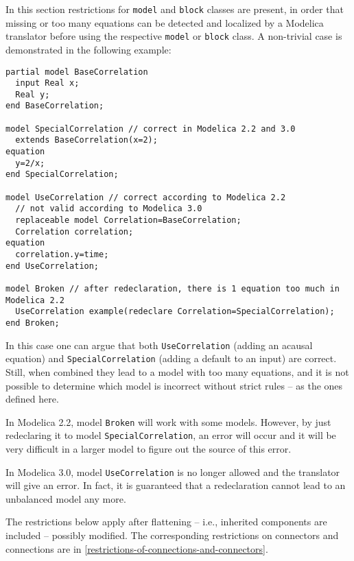 \begin{nonnormative}
In this section restrictions for \lstinline!model! and \lstinline!block! classes are present, in order that missing or too many equations can be detected and localized by a Modelica translator before using the respective \lstinline!model! or \lstinline!block! class.
A non-trivial case is demonstrated in the following example:
\begin{lstlisting}[language=modelica]
partial model BaseCorrelation
  input Real x;
  Real y;
end BaseCorrelation;

model SpecialCorrelation // correct in Modelica 2.2 and 3.0
  extends BaseCorrelation(x=2);
equation
  y=2/x;
end SpecialCorrelation;

model UseCorrelation // correct according to Modelica 2.2
  // not valid according to Modelica 3.0
  replaceable model Correlation=BaseCorrelation;
  Correlation correlation;
equation
  correlation.y=time;
end UseCorrelation;

model Broken // after redeclaration, there is 1 equation too much in Modelica 2.2
  UseCorrelation example(redeclare Correlation=SpecialCorrelation);
end Broken;
\end{lstlisting}

In this case one can argue that both \lstinline!UseCorrelation! (adding an acausal equation) and \lstinline!SpecialCorrelation! (adding a default to an input) are correct.
Still, when combined they lead to a model with too many equations, and it is not possible to determine which model is incorrect without strict rules -- as the ones defined here.

In Modelica 2.2, model \lstinline!Broken! will work with some models.
However, by just redeclaring it to model \lstinline!SpecialCorrelation!, an error will occur and it will be very difficult in a larger model to figure out the source of this error.

In Modelica 3.0, model \lstinline!UseCorrelation! is no longer allowed and the translator will give an error.
In fact, it is guaranteed that a redeclaration cannot lead to an unbalanced model any more.
\end{nonnormative}

The restrictions below apply after flattening -- i.e., inherited components are included -- possibly modified.
The corresponding restrictions on connectors and connections are in \cref{restrictions-of-connections-and-connectors}.

